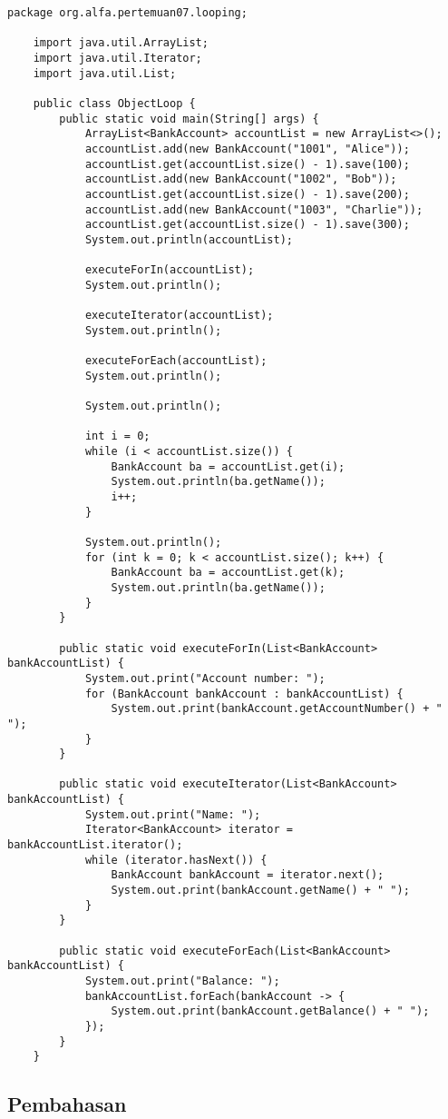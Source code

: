 \begin{lstlisting}[style=JavaStyle]
	package org.alfa.pertemuan07.looping;
	
	import java.util.ArrayList;
	import java.util.Iterator;
	import java.util.List;
	
	public class ObjectLoop {
		public static void main(String[] args) {
			ArrayList<BankAccount> accountList = new ArrayList<>();
			accountList.add(new BankAccount("1001", "Alice"));
			accountList.get(accountList.size() - 1).save(100);
			accountList.add(new BankAccount("1002", "Bob"));
			accountList.get(accountList.size() - 1).save(200);
			accountList.add(new BankAccount("1003", "Charlie"));
			accountList.get(accountList.size() - 1).save(300);
			System.out.println(accountList);
			
			executeForIn(accountList);
			System.out.println();
			
			executeIterator(accountList);
			System.out.println();
			
			executeForEach(accountList);
			System.out.println();
			
			System.out.println();
			
			int i = 0;
			while (i < accountList.size()) {
				BankAccount ba = accountList.get(i);
				System.out.println(ba.getName());
				i++;
			}
			
			System.out.println();
			for (int k = 0; k < accountList.size(); k++) {
				BankAccount ba = accountList.get(k);
				System.out.println(ba.getName());
			}
		}
		
		public static void executeForIn(List<BankAccount> bankAccountList) {
			System.out.print("Account number: ");
			for (BankAccount bankAccount : bankAccountList) {
				System.out.print(bankAccount.getAccountNumber() + " ");
			}
		}
		
		public static void executeIterator(List<BankAccount> bankAccountList) {
			System.out.print("Name: ");
			Iterator<BankAccount> iterator = bankAccountList.iterator();
			while (iterator.hasNext()) {
				BankAccount bankAccount = iterator.next();
				System.out.print(bankAccount.getName() + " ");
			}
		}
		
		public static void executeForEach(List<BankAccount> bankAccountList) {
			System.out.print("Balance: ");
			bankAccountList.forEach(bankAccount -> {
				System.out.print(bankAccount.getBalance() + " ");
			});
		}
	}
\end{lstlisting}

\subsection{Pembahasan}


